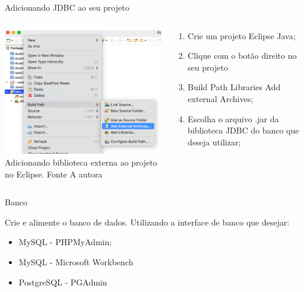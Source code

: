 \documentclass[11pt,aspectratio=43,ignorenonframetext,t]{beamer}
\begin{document}
\begin{frame}{Adicionando JDBC ao seu projeto}
  \begin{columns}
    \begin{column}{0.3\textwidth}
      \begin{center}
	\includegraphics[height=0.4\paperheight]{fig/aula22/aula8_1_1.png}\\
    \tiny{Adicionando biblioteca externa ao projeto no Eclipse. Fonte A autora}
      \end{center}
    \end{column}
    \begin{column}{0.4\textwidth}
        \begin{enumerate}
	  \item Crie um projeto Eclipse Java;
	  \item Clique com o botão direito no seu projeto
	  \item Build Path \rightarrow Libraries \rightarrow Add external Archives;
	  \item Escolha o arquivo .jar da biblioteca JDBC do banco que deseja utilizar;
	\end{enumerate}
   \end{column}
  \end{columns}
\end{frame}
\begin{frame}{Banco}
 
 Crie e alimente o banco de dados. Utilizando a interface de banco que desejar:
 \begin{itemize}
     \item MySQL - PHPMyAdmin;
     \item MySQL - Microsoft Workbench
     \item PostgreSQL - PGAdmin
 \end{itemize}
\end{frame}
\end{document}
